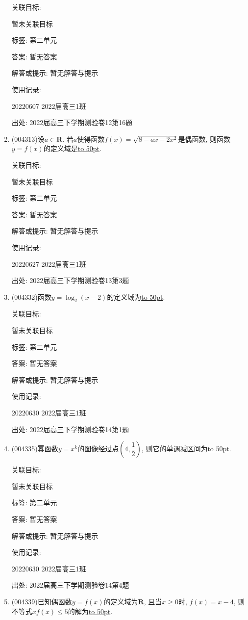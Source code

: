 \documentclass[10pt,a4paper]{article}
\newcommand{\blank}[1]{\underline{\hbox to #1pt{}}}
\begin{document}
\begin{enumerate}[1.]
关联目标:

暂未关联目标



标签: 第二单元

答案: 暂无答案

解答或提示: 暂无解答与提示

使用记录:

20220607	2022届高三1班	


出处: 2022届高三下学期测验卷12第16题
\item { (004313)}设$a\in \mathbf{R}$. 若$a$使得函数$f(x)=\sqrt{8-ax-2x^2}$是偶函数, 则函数$y=f(x)$的定义域是\blank{50}.


关联目标:

暂未关联目标



标签: 第二单元

答案: 暂无答案

解答或提示: 暂无解答与提示

使用记录:

20220627	2022届高三1班	


出处: 2022届高三下学期测验卷13第3题
\item { (004332)}函数$y=\log_2(x-2)$的定义域为\blank{50}.


关联目标:

暂未关联目标



标签: 第二单元

答案: 暂无答案

解答或提示: 暂无解答与提示

使用记录:

20220630	2022届高三1班	


出处: 2022届高三下学期测验卷14第1题
\item { (004335)}幂函数$y=x^k$的图像经过点$(4,\dfrac 12)$, 则它的单调减区间为\blank{50}.


关联目标:

暂未关联目标



标签: 第二单元

答案: 暂无答案

解答或提示: 暂无解答与提示

使用记录:

20220630	2022届高三1班	


出处: 2022届高三下学期测验卷14第4题
\item { (004339)}已知偶函数$y=f(x)$的定义域为$\mathbf{R}$, 且当$x\ge 0$时, $f(x)=x-4$, 则不等式$xf(x)\le 5$的解为\blank{50}.



\end{enumerate}
\end{document}
